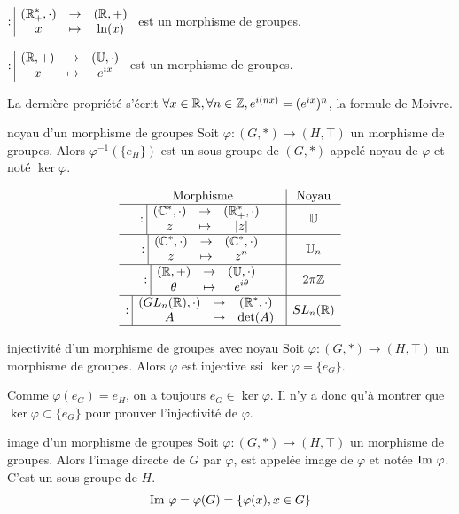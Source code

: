 \begin{exemple}
    $: \space \begin{array}{|ccc} \displaystyle (\mathbb{R}_+^*, \cdot) & \to & \displaystyle (\mathbb{R}, +) \\ \displaystyle x & \mapsto & \displaystyle \ln(x) \end{array}$ est un morphisme de groupes.
    
    $: \space \begin{array}{|ccc} \displaystyle (\mathbb{R}, +) & \to & \displaystyle (\mathbb U, \cdot) \\ \displaystyle x & \mapsto & \displaystyle e^{ix} \end{array}$ est un morphisme de groupes.

    La dernière propriété s'écrit $\forall x \in \mathbb{R}, \forall n \in \mathbb{Z}, e^{i(nx)} = (e^{ix})^n$, 
    la formule de Moivre.
\end{exemple}

\begin{theoreme}{noyau d'un morphisme de groupes}{}
    Soit $\varphi : (G, \ast) \to (H, \top)$ un morphisme de groupes. 
    Alors $\varphi^{-1}(\{e_H\})$ est un sous-groupe de $(G, \ast)$ appelé noyau de 
    $\varphi$ et noté $\ker \varphi$.
\end{theoreme}

\begin{exemple}
    $$
    \begin{array}{c|c}
        \text{Morphisme} & \text{Noyau} \\ \hline
        : \space \begin{array}{|ccc} \displaystyle (\mathbb{C}^*, \cdot) & \to & \displaystyle (\mathbb{R}_+^*, \cdot) \\ \displaystyle z & \mapsto & \displaystyle |z| \end{array} & \mathbb U \\ \hline
        : \space \begin{array}{|ccc} \displaystyle (\mathbb{C}^*, \cdot) & \to & \displaystyle (\mathbb{C}^*, \cdot) \\ \displaystyle z & \mapsto & \displaystyle z^n \end{array} & \mathbb U_n \\ \hline
        : \space \begin{array}{|ccc} \displaystyle (\mathbb{R}, +) & \to & \displaystyle (\mathbb U, \cdot) \\ \displaystyle \theta & \mapsto & \displaystyle e^{i\theta} \end{array} & 2\pi \mathbb{Z} \\ \hline
        : \space \begin{array}{|ccc} \displaystyle (GL_n(\mathbb{R}), \cdot) & \to & \displaystyle (\mathbb{R}^*, \cdot) \\ \displaystyle A & \mapsto & \displaystyle \det(A) \end{array} & SL_n(\mathbb{R}) \\ \hline
    \end{array}$$
\end{exemple}

\begin{theoreme}{injectivité d'un morphisme de groupes avec noyau}{}
    Soit $\varphi : (G, \ast) \to (H, \top)$ un morphisme de groupes.
    Alors $\varphi$ est injective ssi $\ker \varphi = \{e_G\}$.
\end{theoreme}

\begin{remarque}
    Comme $\varphi(e_G) = e_H$, on a toujours $e_G \in \ker \varphi$.
    Il n'y a donc qu'à montrer que $\ker \varphi \subset \{e_G\}$ pour prouver l'injectivité de $\varphi$.
\end{remarque}

\begin{proposition}{image d'un morphisme de groupes}{}
    Soit $\varphi : (G, \ast) \to (H, \top)$ un morphisme de groupes. Alors l'image directe de 
    $G$ par $\varphi$, est appelée image de $\varphi$ et notée $\operatorname{Im} \, \varphi$. C'est un sous-groupe de $H$.
    $$\operatorname{Im} \, \varphi = \varphi(G) = \{\varphi(x), x \in G\}$$
    
\end{proposition}

